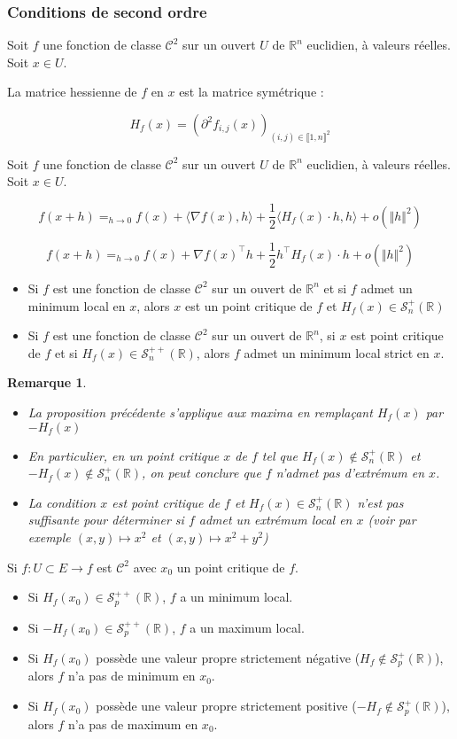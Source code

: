 \documentclass[a4paper,12pt]{book}
\newcommand{\Def}[2]{\begin{tcolorbox}[sharp corners, colback=white,colframe=blue!90!black!75, title=Définition : #1]#2\end{tcolorbox}}
\newcommand{\Prop}[2]{\begin{tcolorbox}[sharp corners, colback=white,colframe=red!90!black!75, title=Proposition : #1]#2\end{tcolorbox}}
\newtheorem{Rem}{Remarque}[section]
\def\R{\mathbb{R}}
\begin{document}
\subsubsection{Conditions de second ordre}
\Def{}{Soit $f$ une fonction de classe $\mathcal{C}^2$ sur un ouvert $U$ de $\R^n$ euclidien, à valeurs réelles. Soit $x\in U$.
\par La matrice hessienne de $f$ en $x$ est la matrice symétrique :
\par $$H_f(x) = (\partial^2 f_{i,j}(x))_{(i,j)\in\llbracket1,n\rrbracket^2}$$}
\Prop{Formule de Taylor-Young à l'ordre 2}{Soit $f$ une fonction de classe $\mathcal{C}^2$ sur un ouvert $U$ de $\R^n$ euclidien, à valeurs réelles. Soit $x\in U$.
\par $$f(x+h)=_{h\to 0} f(x) + \langle \nabla f(x), h\rangle + \frac{1}{2}\langle H_f(x)\cdot h, h\rangle + o(\Vert h\Vert^2)$$
\par $$f(x+h)=_{h\to 0} f(x) + \nabla f(x)^\top h + \frac{1}{2}h^\top H_f(x)\cdot h + o(\Vert h\Vert^2)$$}
\Prop{}{\begin{itemize}
\item Si $f$ est une fonction de classe $\mathcal{C}^2$ sur un ouvert de $\R^n$ et si $f$ admet un minimum local en $x$, alors $x$ est un point critique de $f$ et $H_f(x)\in\mathcal{S}_n^+(\R)$
\item Si $f$ est une fonction de classe $\mathcal{C}^2$ sur un ouvert de $\R^n$, si $x$ est point critique de $f$ et si $H_f(x)\in\mathcal{S}_n^{++}(\R)$, alors $f$ admet un minimum local strict en $x$.
\end{itemize}}
\begin{Rem}
\begin{itemize}
\item La proposition précédente s'applique aux maxima en remplaçant $H_f(x)$ par $-H_f(x)$
\item En particulier, en un point critique $x$ de $f$ tel que $H_f(x)\notin\mathcal{S}_n^+(\R)$ et $-H_f(x)\notin\mathcal{S}_n^+(\R)$, on peut conclure que $f$ n'admet pas d'extrémum en $x$.
\item La condition $x$ est point critique de $f$ et $H_f(x)\in\mathcal{S}_n^+(\R)$ n'est pas suffisante pour déterminer si $f$ admet un extrémum local en $x$ (voir par exemple $(x,y)\mapsto x^2$ et $(x,y)\mapsto x^2+y^2$)
\end{itemize}
\end{Rem}
\Prop{Autre formulation}{Si $f:U\subset E\to f$ est $\mathcal{C}^2$ avec $x_0$ un point critique de $f$.\begin{itemize}
\item Si $H_f(x_0)\in\mathcal{S}_p^{++}(\R)$, $f$ a un minimum local.
\item Si $-H_f(x_0)\in\mathcal{S}_p^{++}(\R)$, $f$ a un maximum local.
\item Si $H_f(x_0)$ possède une valeur propre strictement négative ($H_f\notin\mathcal{S}_p^+(\R)$), alors $f$ n'a pas de minimum en $x_0$.
\item Si $H_f(x_0)$ possède une valeur propre strictement positive ($-H_f\notin\mathcal{S}_p^+(\R)$), alors $f$ n'a pas de maximum en $x_0$.
\end{itemize}}
\end{document}
